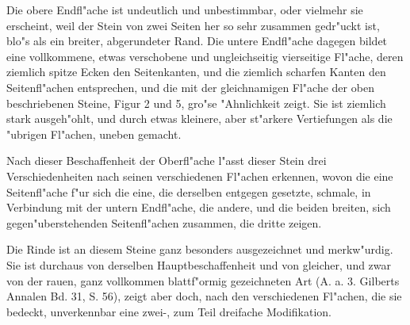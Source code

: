 \documentclass[a4paper, 11pt, oneside, german]{article}
\begin{document}
Die obere Endfl"ache ist undeutlich und unbestimmbar, oder vielmehr sie erscheint, weil der Stein von zwei Seiten her so sehr zusammen gedr"uckt ist, blo"s als ein breiter, abgerundeter Rand. Die untere Endfl"ache dagegen bildet eine vollkommene, etwas verschobene und ungleichseitig vierseitige Fl"ache, deren ziemlich spitze Ecken den Seitenkanten, und die ziemlich scharfen Kanten den Seitenfl"achen entsprechen, und die mit der gleichnamigen Fl"ache der oben beschriebenen Steine, Figur 2 und 5, gro"se "Ahnlichkeit zeigt. Sie ist ziemlich stark ausgeh"ohlt, und durch etwas kleinere, aber st"arkere Vertiefungen als die "ubrigen Fl"achen, uneben gemacht.

Nach dieser Beschaffenheit der Oberfl"ache l"asst dieser Stein drei Verschiedenheiten nach seinen verschiedenen Fl"achen erkennen, wovon die eine Seitenfl"ache f"ur sich die eine, die derselben entgegen gesetzte, schmale, in Verbindung mit der untern Endfl"ache, die andere, und die beiden breiten, sich gegen"uberstehenden Seitenfl"achen zusammen, die dritte zeigen.

Die Rinde ist an diesem Steine ganz besonders ausgezeichnet und merkw"urdig. Sie ist durchaus von derselben Hauptbeschaffenheit und von gleicher, und zwar von der rauen, ganz vollkommen blattf"ormig gezeichneten Art (A. a. 3. Gilberts Annalen Bd. 31, S. 56), zeigt aber doch, nach den verschiedenen Fl"achen, die sie bedeckt, unverkennbar eine zwei-, zum Teil dreifache Modifikation.
\end{document}
